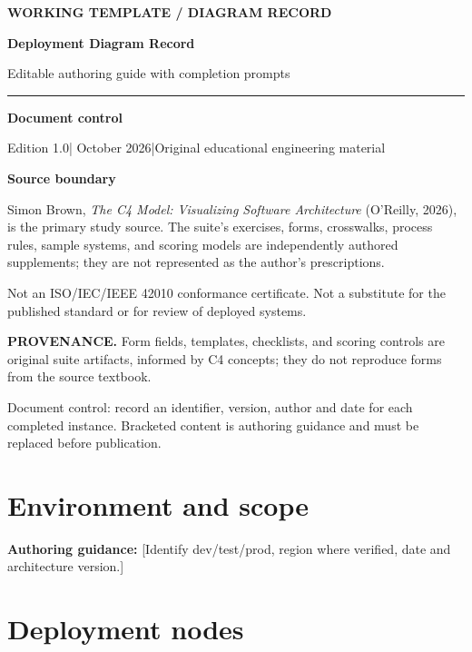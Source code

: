 \documentclass[10pt,letterpaper]{article}
\newcommand{\WritingSpace}[1]{\par\vspace{2pt}\noindent\fcolorbox{C4Line}{white}{\parbox[t][#1][t]{0.94\linewidth}{\hspace{1pt}}}\par\vspace{7pt}}
\newcommand{\Prompter}[1]{\par{\small\color{C4Teal}\textbf{Authoring guidance:} #1}\par}
\newcommand{\SourceNote}[1]{\par\smallskip\noindent\colorbox{C4Light}{\parbox{0.94\linewidth}{\footnotesize\textbf{PROVENANCE.} #1}}\par\medskip}
\newcommand{\DocStart}[3]{%
\begin{document}
\begin{titlepage}
\renewcommand{\thepage}{title-\arabic{page}}
\vspace*{0.55in}
{\sffamily\bfseries\small\color{C4Teal}#1}\par\vspace{0.24in}
{\sffamily\bfseries\fontsize{26}{31}\selectfont\color{C4Navy}#2}\par\vspace{0.18in}
{\large\color{C4Gray}#3}\par\vspace{0.4in}
\textcolor{C4Teal}{\rule{\linewidth}{1.15pt}}\par\vspace{0.24in}
\textbf{Document control}\par
Edition 1.0\quad|\quad 30 October 2026\quad|\quad Original educational engineering material\par
\vspace{0.17in}
\textbf{Source boundary}\par
Simon Brown, \emph{The C4 Model: Visualizing Software Architecture} (O'Reilly, 2026), is the primary study source. The suite's exercises, forms, crosswalks, process rules, sample systems, and scoring models are independently authored supplements; they are not represented as the author's prescriptions.\par
\vfill
{\small\color{C4Gray}Not an ISO/IEC/IEEE 42010 conformance certificate. Not a substitute for the published standard or for review of deployed systems.}\par
\end{titlepage}
}
\DocStart{WORKING TEMPLATE / DIAGRAM RECORD}{Deployment Diagram Record}{Editable authoring guide with completion prompts}
\SourceNote{Form fields, templates, checklists, and scoring controls are original suite artifacts, informed by C4 concepts; they do not reproduce forms from the source textbook.}
Document control: record an identifier, version, author and date for each completed instance. Bracketed content is authoring guidance and must be replaced before publication.

\section{Environment and scope}

\Prompter{[Identify dev/test/prod, region where verified, date and architecture version.]}
\WritingSpace{0.65in}
\section{Deployment nodes}
\end{document}
